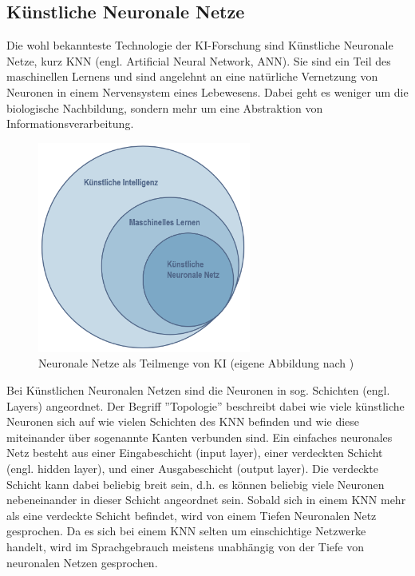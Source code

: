 \documentclass[a4paper,12pt, german]{report}
\begin{document}
\subsection{Künstliche Neuronale Netze}

Die wohl bekannteste Technologie der KI-Forschung sind Künstliche Neuronale Netze, kurz KNN (engl. Artificial Neural Network, ANN). Sie sind ein Teil des maschinellen Lernens und sind angelehnt an eine natürliche Vernetzung von Neuronen in einem Nervensystem eines Lebewesens. Dabei geht es weniger um die biologische Nachbildung, sondern mehr um eine Abstraktion von Informationsverarbeitung. \cite{17}

\begin{figure}[H]
  \center
 \includegraphics[width=7cm]{images/EinordnungKNN.pptx.png}
  \caption[Neuronale Netze als Teilmenge von KI]{Neuronale Netze als Teilmenge von KI (eigene Abbildung nach \cite{17})}
\end{figure}

Bei Künstlichen Neuronalen Netzen sind die Neuronen in sog. Schichten (engl. Layers) angeordnet. Der Begriff ''Topologie'' beschreibt dabei wie viele künstliche Neuronen sich auf wie vielen Schichten des KNN befinden und wie diese miteinander über sogenannte Kanten verbunden sind. Ein einfaches neuronales Netz besteht aus einer Eingabeschicht (input layer), einer verdeckten Schicht (engl. hidden layer), und einer Ausgabeschicht (output layer). Die verdeckte Schicht kann dabei beliebig breit sein, d.h. es können beliebig viele Neuronen nebeneinander in dieser Schicht angeordnet sein. Sobald sich in einem KNN mehr als eine verdeckte Schicht befindet, wird von einem Tiefen Neuronalen Netz gesprochen. Da es sich bei einem KNN selten um einschichtige Netzwerke handelt, wird im Sprachgebrauch meistens unabhängig von der Tiefe von neuronalen Netzen gesprochen.\cite{17}
\end{document}
